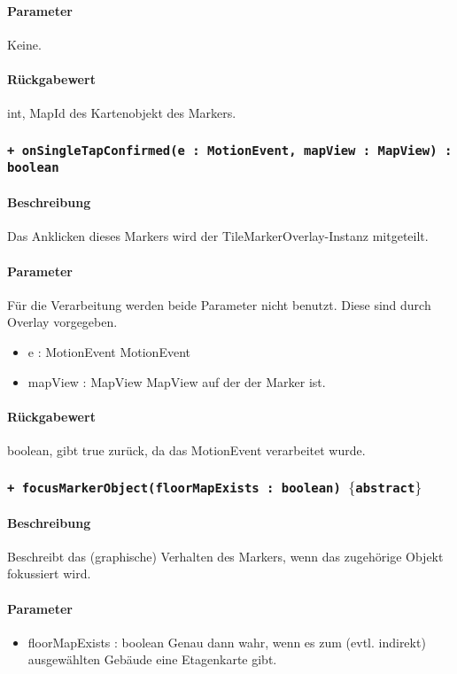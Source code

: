 \paragraph*{Parameter}
Keine.
\paragraph*{Rückgabewert}
int, MapId des Kartenobjekt des Markers.

\subsubsection*{\texttt{+ onSingleTapConfirmed(e : MotionEvent, mapView : MapView) : boolean}}%
\paragraph*{Beschreibung}
Das Anklicken dieses Markers wird der TileMarkerOverlay-Instanz mitgeteilt.
\paragraph*{Parameter}
Für die Verarbeitung werden beide Parameter nicht benutzt. Diese sind durch Overlay vorgegeben.
\begin{itemize}
    \item e : MotionEvent MotionEvent
    \item mapView : MapView MapView auf der der Marker ist.
\end{itemize}
\paragraph*{Rückgabewert}
boolean, gibt true zurück, da das MotionEvent verarbeitet wurde.

\subsubsection*{\texttt{+ focusMarkerObject(floorMapExists : boolean) $\lbrace$abstract$\rbrace$}}%
\paragraph*{Beschreibung}
Beschreibt das (graphische) Verhalten des Markers, wenn das zugehörige Objekt fokussiert wird.
\paragraph*{Parameter}
\begin{itemize}
    \item floorMapExists : boolean Genau dann wahr, wenn es zum (evtl. indirekt) ausgewählten Gebäude eine Etagenkarte gibt.
\end{itemize}
